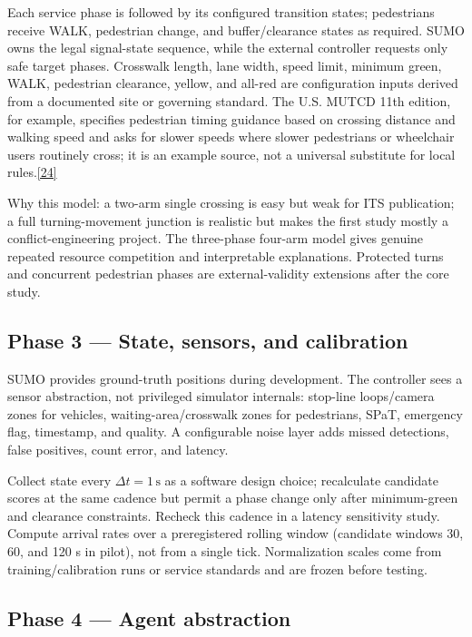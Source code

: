 \documentclass[
  english,
  11pt,
  a4paper,
]{article}
\begin{document}
Each service phase is followed by its configured transition states;
pedestrians receive WALK, pedestrian change, and buffer/clearance states
as required. SUMO owns the legal signal-state sequence, while the
external controller requests only safe target phases. Crosswalk length,
lane width, speed limit, minimum green, WALK, pedestrian clearance,
yellow, and all-red are configuration inputs derived from a documented
site or governing standard. The U.S. MUTCD 11th edition, for example,
specifies pedestrian timing guidance based on crossing distance and
walking speed and asks for slower speeds where slower pedestrians or
wheelchair users routinely cross; it is an example source, not a
universal substitute for local rules.\hyperref[source-24]{[24]}

Why this model: a two-arm single crossing is easy but weak for ITS
publication; a full turning-movement junction is realistic but makes the
first study mostly a conflict-engineering project. The three-phase
four-arm model gives genuine repeated resource competition and
interpretable explanations. Protected turns and concurrent pedestrian
phases are external-validity extensions after the core study.

\subsection{Phase 3 --- State, sensors, and
calibration}\label{phase-3-state-sensors-and-calibration}

SUMO provides ground-truth positions during development. The controller
sees a sensor abstraction, not privileged simulator internals: stop-line
loops/camera zones for vehicles, waiting-area/crosswalk zones for
pedestrians, SPaT, emergency flag, timestamp, and quality. A
configurable noise layer adds missed detections, false positives, count
error, and latency.

Collect state every \(\Delta t = 1\,\mathrm{s}\) as a software design choice;
recalculate candidate scores at the same cadence but permit a phase
change only after minimum-green and clearance constraints. Recheck this
cadence in a latency sensitivity study. Compute arrival rates over a
preregistered rolling window (candidate windows 30, 60, and 120 s in
pilot), not from a single tick. Normalization scales come from
training/calibration runs or service standards and are frozen before
testing.

\subsection{Phase 4 --- Agent
abstraction}\label{phase-4-agent-abstraction}
\end{document}
